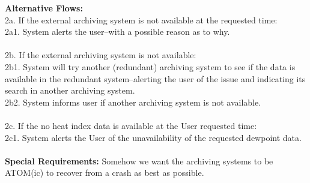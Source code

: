 \documentclass[letterpaper]{article}
\begin{document}
\textbf{Alternative Flows:  }\\
2a.  If the external archiving system is not available at the
requested time:\\
2a1. System alerts the user--with a possible reason as to
why.\\\\
2b.  If the external archiving system is not available:\\
2b1. System
will try another (redundant) archiving system to see if the data is
available in the redundant system--alerting the user of the issue and
indicating its search in another archiving system.\\
2b2.  System informs user if another archiving system is not
available.\\\\
2c.  If the no heat index data is available at the User requested
time:\\
\quad2c1. System alerts the User of the unavailability of the
requested dewpoint data.\\\\
\textbf{Special Requirements:  }Somehow we want the archiving systems
to be ATOM(ic) to recover from a crash as best as possible.\\\\
\end{document}
